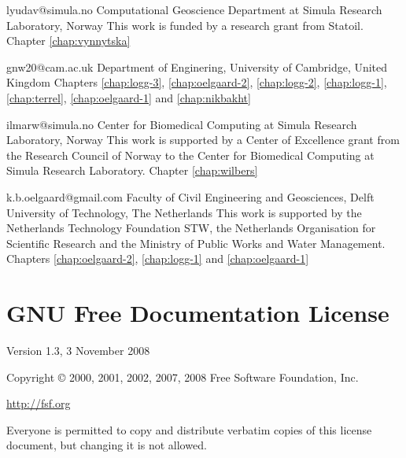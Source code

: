              {lyudav@simula.no}
             {Computational Geoscience Department at Simula Research Laboratory, Norway}
             {This work is funded by a research grant from Statoil.}
             {Chapter \ref{chap:vynnytska}}

             {gnw20@cam.ac.uk}
             {Department of Enginering, University of Cambridge, United Kingdom}
             {}
             {Chapters
              \ref{chap:logg-3},
              \ref{chap:oelgaard-2},
              \ref{chap:logg-2},
              \ref{chap:logg-1},
              \ref{chap:terrel},
              \ref{chap:oelgaard-1} and
              \ref{chap:nikbakht}}

             {ilmarw@simula.no}
             {Center for Biomedical Computing at Simula Research Laboratory, Norway}
             {This work is supported by a Center of Excellence grant
              from the Research Council of Norway to the Center for
              Biomedical Computing at Simula Research Laboratory.}
             {Chapter \ref{chap:wilbers}}

             {k.b.oelgaard@gmail.com}
             {Faculty of Civil Engineering and Geosciences,
              Delft University of Technology, The Netherlands}
             {This work is supported by the Netherlands Technology Foundation
              STW, the Netherlands Organisation for Scientific Research and the
              Ministry of Public Works and Water Management.}
             {Chapters
              \ref{chap:oelgaard-2},
              \ref{chap:logg-1} and
              \ref{chap:oelgaard-1}}



\chapter*{GNU Free Documentation License}
\addtocounter{chapter}{1}
\vspace{-1cm}

Version 1.3, 3 November 2008

Copyright \copyright{} 2000, 2001, 2002, 2007, 2008  Free Software Foundation, Inc.

\bigskip

\url{http://fsf.org}

\bigskip

Everyone is permitted to copy and distribute verbatim copies of this
license document, but changing it is not allowed.

